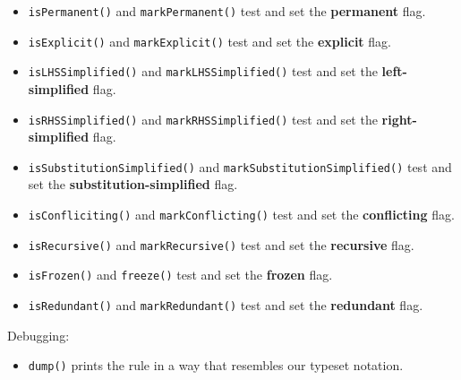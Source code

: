 \documentclass[../generics]{subfiles}
\begin{document}
\begin{itemize}
\item \texttt{isPermanent()} and \texttt{markPermanent()} test and set the \textbf{permanent} flag.
\item \texttt{isExplicit()} and \texttt{markExplicit()} test and set the \textbf{explicit} flag.
\item \texttt{isLHSSimplified()} and \texttt{markLHSSimplified()} test and set the \textbf{left-simplified} flag.
\item \texttt{isRHSSimplified()} and \texttt{markRHSSimplified()} test and set the \textbf{right-simplified} flag.
\item \texttt{isSubstitutionSimplified()} and \texttt{markSubstitutionSimplified()} test and set the \textbf{substitution-simplified} flag.
\item \texttt{isConfliciting()} and \texttt{markConflicting()} test and set the \textbf{conflicting} flag.
\item \texttt{isRecursive()} and \texttt{markRecursive()} test and set the \textbf{recursive} flag.
\item \texttt{isFrozen()} and \texttt{freeze()} test and set the \textbf{frozen} flag.
\item \texttt{isRedundant()} and \texttt{markRedundant()} test and set the \textbf{redundant} flag.
\end{itemize}
Debugging:
\begin{itemize}
\item \texttt{dump()} prints the rule in a way that resembles our typeset notation.
\end{itemize}
\end{document}
